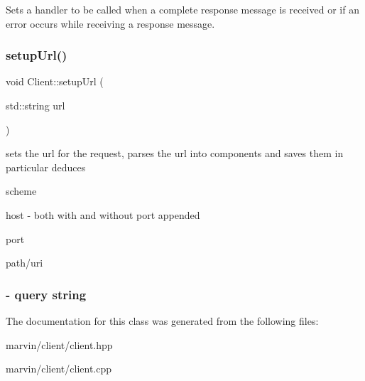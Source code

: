 Sets a handler to be called when a complete response message is received or if an error occurs while receiving a response message. \mbox{\label{class_client_a6d0d6b3a672370c201a24c839c5f7382}} 
\subsubsection{\texorpdfstring{setup\+Url()}{setupUrl()}}
{\footnotesize\ttfamily void Client\+::setup\+Url (\begin{DoxyParamCaption}\item[{std\+::string}]{url }\end{DoxyParamCaption})\hspace{0.3cm}{\ttfamily [protected]}}



 sets the url for the request, parses the url into components and saves them in particular deduces
\begin{DoxyItemize}
\item scheme
\item host -\/ both with and without port appended
\item port
\item path/uri \subsubsection*{-\/ query string }
\end{DoxyItemize}

The documentation for this class was generated from the following files\+:\begin{DoxyCompactItemize}
\item 
marvin/client/client.\+hpp\item 
marvin/client/client.\+cpp\end{DoxyCompactItemize}
